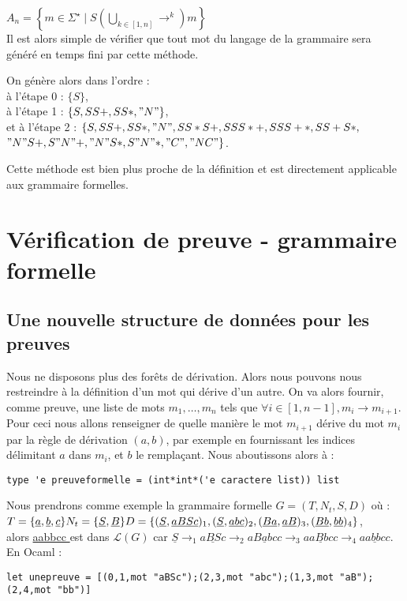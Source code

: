 \documentclass[a4paper,12pt]{article}
\begin{document}
$A_n = \left\{m \in \Sigma^\star \mid  S \left(\bigcup_{k \in [1,n]} \rightarrow^k\right) m\right\}$\\
Il est alors simple de vérifier que tout mot du langage de la grammaire sera généré en temps fini par cette méthode.

On génère alors dans l'ordre :\\
à l'étape 0 : $\{S\}$, \\
à l'étape 1 : $\{S,SS+,SS*,"N"\}$,\\
et à l'étape 2 : $\{S,SS+,SS*,"N",SS*S+,SSS*+,SSS+*,SS+S*,$ \\
$"N"S+,S"N"+,"N"S*,S"N"*,"C","NC"\}$.

Cette méthode est bien plus proche de la définition et est directement applicable aux grammaire formelles.

\section{Vérification de preuve - grammaire formelle}

\subsection{Une nouvelle structure de données pour les preuves}

Nous ne disposons plus des forêts de dérivation. Alors nous pouvons nous restreindre à la définition d'un mot qui dérive d'un autre.
On va alors fournir, comme preuve, une liste de mots $m_1, \dots, m_n$ tels que $\forall i\in [1,n-1], m_i \rightarrow m_{i+1}$. 
Pour ceci nous allons renseigner de quelle manière le mot $m_{i+1}$ dérive du mot $m_i$ par la règle de dérivation $(a,b)$, par exemple en fournissant les indices délimitant $a$ dans $m_i$, et $b$ le remplaçant.
Nous aboutissons alors à :
{\color{DarkBlue}\begin{verbatim}
type 'e preuveformelle = (int*int*('e caractere list)) list
\end{verbatim}}

Nous prendrons comme exemple la grammaire formelle $G = (T,N_t,S,D)$ où :\\
$
T = \{\underline{ a },\underline{ b },\underline{ c }\}\\
N_t = \{\underline{ S },\underline{ B }\}\\
D = \{(\underline{ S },\underline{ aBSc })_1,(\underline{ S },\underline{ abc })_2,(\underline{ Ba },\underline{ aB })_3,(\underline{ Bb },\underline{ bb })_4\}
$,\\
alors \underline{ aabbcc } est dans $\mathcal{L}(G)$ car $\underline{ S } \rightarrow_1 \underline{ aBSc } \rightarrow_2 \underline{ aBabcc } \rightarrow_3 \underline{ aaBbcc } \rightarrow_4 \underline{ aabbcc }$.\\
En Ocaml :
{\color{DarkBlue}\begin{verbatim}
let unepreuve = [(0,1,mot "aBSc");(2,3,mot "abc");(1,3,mot "aB");(2,4,mot "bb")]
\end{verbatim}}
\end{document}
